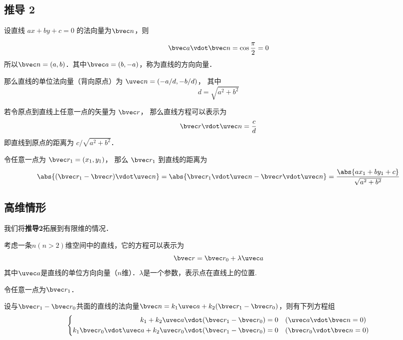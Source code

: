 \subsection{推导 2}

设直线 $ax + by + c = 0$ 的法向量为$\bvec n$，则

\begin{equation}
\bvec a \vdot \bvec n = \cos \frac{\pi}{2} = 0
\end{equation}
所以$\bvec n=(a,b)$．其中$\bvec a=(b,-a)$，称为直线的方向向量．

那么直线的单位法向量（背向原点）为 $\uvec n = (-a/d, -b/d)$， 其中
\begin{equation}
d = \sqrt{a^2 + b^2}
\end{equation}

若令原点到直线上任意一点的矢量为 $\bvec r$， 那么直线方程可以表示为
\begin{equation}
\bvec r \vdot \uvec n = \frac{c}{d}
\end{equation}
即直线到原点的距离为 $c/\sqrt{a^2 + b^2}$．

令任意一点为 $\bvec r_1 = (x_1, y_1)$， 那么 $\bvec r_1$ 到直线的距离为
\begin{equation}
\abs{(\bvec r_1 - \bvec r)\vdot \uvec n} = \abs{\bvec r_1\vdot \uvec n - \bvec r \vdot \uvec n}
= \frac{\abs{ax_1 + by_1 + c}}{\sqrt{a^2 + b^2}}
\end{equation}


 






\subsection{高维情形}


我们将\textbf{推导2}拓展到有限维的情况．

考虑一条$n(n>2)$维空间中的直线，它的方程可以表示为
\begin{equation}
\bvec r = \bvec r_0 + \lambda\uvec a
\end{equation}
其中$\uvec a$是直线的单位方向向量（$n$维）．$\lambda$是一个参数，表示点在直线上的位置.

令任意一点为$\bvec r_1$．

设与$\bvec r_1 - \bvec r_0$共面的直线的法向量$\bvec n=k_1 \uvec a + k_2 (\bvec r_1 - \bvec r_0)$，则有下列方程组
\begin{equation}
\left\lbrace
\begin{aligned}
k_1 + k_2 \uvec a \vdot (\bvec r_1 - \bvec r_0) &= 0 \quad (\uvec a \vdot \bvec n = 0)\\
k_1\bvec r_0\vdot\uvec a + k_2 \uvec r_0\vdot (\bvec r_1 - \bvec r_0) &= 0 \quad (\bvec r_0 \vdot \bvec n = 0)\\
\end{aligned}
\right.
\end{equation}

